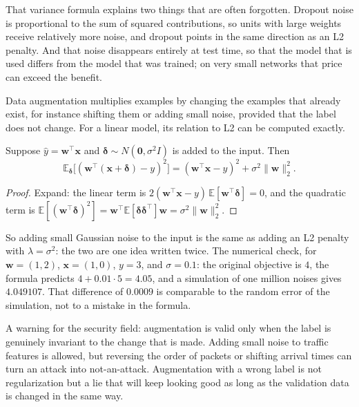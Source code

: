 That variance formula explains two things that are often forgotten. Dropout noise is
proportional to the sum of squared contributions, so units with large weights receive
relatively more noise, and dropout points in the same direction as an L2 penalty. And
that noise disappears entirely at test time, so that the model that is used differs
from the model that was trained; on very small networks that price can exceed the
benefit.

Data augmentation multiplies examples by changing the examples that already exist,
for instance shifting them or adding small noise, provided that the label does not
change. For a linear model, its relation to L2 can be computed exactly.

\begin{proposisi}
Suppose $\hat y=\mathbf{w}^{\top}\mathbf{x}$ and $\boldsymbol{\delta}\sim
N(\mathbf{0},\sigma^2I)$ is added to the input. Then
\[
\mathbb{E}_{\boldsymbol{\delta}}\bigl[(\mathbf{w}^{\top}(\mathbf{x}+\boldsymbol{\delta})-y)^2\bigr]
=(\mathbf{w}^{\top}\mathbf{x}-y)^2+\sigma^2\|\mathbf{w}\|_2^2 .
\]
\end{proposisi}

\begin{proof}[Proof]
Expand: the linear term is $2(\mathbf{w}^{\top}\mathbf{x}-y)\,
\mathbb{E}[\mathbf{w}^{\top}\boldsymbol{\delta}]=0$, and the quadratic term is
$\mathbb{E}[(\mathbf{w}^{\top}\boldsymbol{\delta})^2]
=\mathbf{w}^{\top}\mathbb{E}[\boldsymbol{\delta}\boldsymbol{\delta}^{\top}]\mathbf{w}
=\sigma^2\|\mathbf{w}\|_2^2$.
\end{proof}

So adding small Gaussian noise to the input is the same as adding an L2 penalty with
$\lambda=\sigma^2$: the two are one idea written twice. The numerical check, for
$\mathbf{w}=(1,2)$, $\mathbf{x}=(1,0)$, $y=3$, and $\sigma=0.1$: the original
objective is $4$, the formula predicts $4+0.01\cdot5=4.05$, and a simulation of one
million noises gives $4.049107$. That difference of $0.0009$ is comparable to the
random error of the simulation, not to a mistake in the formula.

A warning for the security field: augmentation is valid only when the label is
genuinely invariant to the change that is made. Adding small noise to traffic
features is allowed, but reversing the order of packets or shifting arrival times can
turn an attack into not-an-attack. Augmentation with a wrong label is not
regularization but a lie that will keep looking good as long as the validation data
is changed in the same way.
